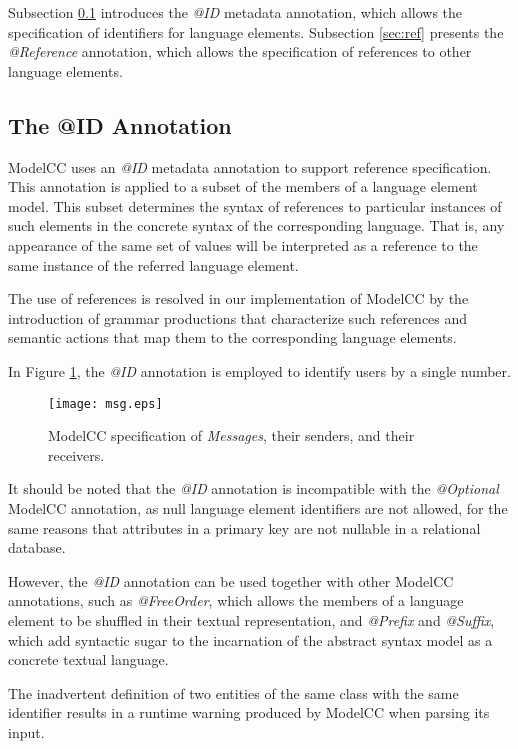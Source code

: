 \documentclass[floatfix,rmp,twocolumn,twoside]{revtex4}
\begin{document}
Subsection \ref{sec:id} introduces the \emph{@ID} metadata annotation, which allows the specification of identifiers for language elements.
Subsection \ref{sec:ref} presents the \emph{@Reference} annotation, which allows the specification of references to other language elements.

\subsection{The @ID Annotation} \label{sec:id}
ModelCC uses an \emph{@ID} metadata annotation to support reference specification. This annotation is applied to a subset of the members of a language element model. This subset determines the syntax of references to particular instances of such elements in the concrete syntax of the corresponding language. That is, any appearance of the same set of values will be interpreted as a reference to the same instance of the referred language element.

The use of references is resolved in our implementation of ModelCC by the introduction of grammar productions that characterize such references and semantic actions that map them to the corresponding language elements.

In Figure \ref{fig:graphuserref}, the \emph{@ID} annotation is employed to identify users by a single number.


\begin{figure}[t]
\centering
\texttt{[image: msg.eps]}
\caption{ModelCC specification of \emph{Messages}, their senders, and their receivers.} \label{fig:graphuserref}
\end{figure}

It should be noted that the \emph{@ID} annotation is incompatible with the \emph{@Optional} ModelCC annotation, as null language element identifiers are not allowed, for the same reasons that attributes in a primary key are not nullable in a relational database.

However, the \emph{@ID} annotation can be used together with other ModelCC annotations, such as \emph{@FreeOrder}, which allows the members of a language element to be shuffled in their textual representation, and \emph{@Prefix} and \emph{@Suffix}, which add syntactic sugar to the incarnation of the abstract syntax model as a concrete textual language.

The inadvertent definition of two entities of the same class with the same identifier results in a runtime warning produced by ModelCC when parsing its input.
\end{document}
